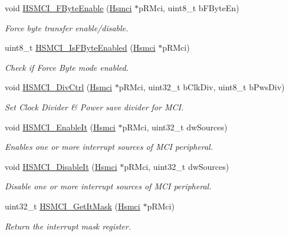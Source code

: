 \begin{DoxyCompactItemize}
void \mbox{\hyperlink{group__hsmci__functions_gafd512a0c9cecc6938fd1d9bbd182af9d}{H\+S\+M\+C\+I\+\_\+\+F\+Byte\+Enable}} (\mbox{\hyperlink{structHsmci}{Hsmci}} $\ast$p\+R\+Mci, uint8\+\_\+t b\+F\+Byte\+En)
\begin{DoxyCompactList}\small\item\em Force byte transfer enable/disable. \end{DoxyCompactList}\item 
uint8\+\_\+t \mbox{\hyperlink{group__hsmci__functions_gad57fce98582202eca10f7911c75e34c3}{H\+S\+M\+C\+I\+\_\+\+Is\+F\+Byte\+Enabled}} (\mbox{\hyperlink{structHsmci}{Hsmci}} $\ast$p\+R\+Mci)
\begin{DoxyCompactList}\small\item\em Check if Force Byte mode enabled. \end{DoxyCompactList}\item 
void \mbox{\hyperlink{group__hsmci__functions_ga3aa96ac076372bb4b34fe58c10640f7a}{H\+S\+M\+C\+I\+\_\+\+Div\+Ctrl}} (\mbox{\hyperlink{structHsmci}{Hsmci}} $\ast$p\+R\+Mci, uint32\+\_\+t b\+Clk\+Div, uint8\+\_\+t b\+Pws\+Div)
\begin{DoxyCompactList}\small\item\em Set Clock Divider \& Power save divider for M\+CI. \end{DoxyCompactList}\item 
void \mbox{\hyperlink{group__hsmci__functions_ga9b3811aee4fc3cef7fcc8b38ab0fa7f2}{H\+S\+M\+C\+I\+\_\+\+Enable\+It}} (\mbox{\hyperlink{structHsmci}{Hsmci}} $\ast$p\+R\+Mci, uint32\+\_\+t dw\+Sources)
\begin{DoxyCompactList}\small\item\em Enables one or more interrupt sources of M\+CI peripheral. \end{DoxyCompactList}\item 
void \mbox{\hyperlink{group__hsmci__functions_ga273099b0076489b4216672fb85d8a813}{H\+S\+M\+C\+I\+\_\+\+Disable\+It}} (\mbox{\hyperlink{structHsmci}{Hsmci}} $\ast$p\+R\+Mci, uint32\+\_\+t dw\+Sources)
\begin{DoxyCompactList}\small\item\em Disable one or more interrupt sources of M\+CI peripheral. \end{DoxyCompactList}\item 
uint32\+\_\+t \mbox{\hyperlink{group__hsmci__functions_gae4fc955f147a6f1fa8d8c511e7f9f4f6}{H\+S\+M\+C\+I\+\_\+\+Get\+It\+Mask}} (\mbox{\hyperlink{structHsmci}{Hsmci}} $\ast$p\+R\+Mci)
\begin{DoxyCompactList}\small\item\em Return the interrupt mask register. \end{DoxyCompactList}\item 

\end{DoxyCompactItemize}
